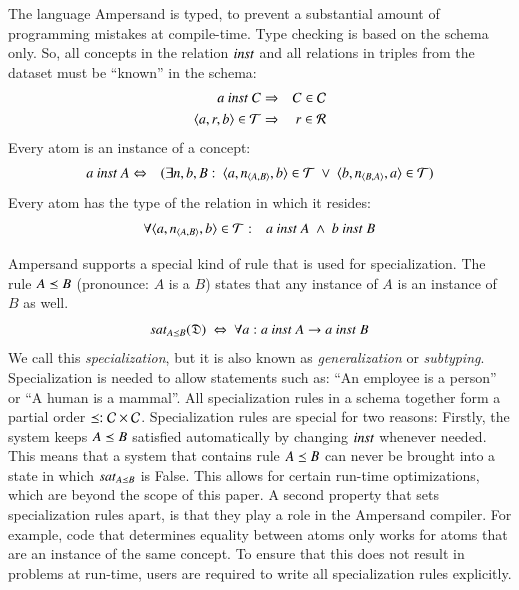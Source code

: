 \documentclass{elsarticle}
\begin{document}
   The language Ampersand is typed, to prevent a substantial amount of programming mistakes at compile-time.
   Type checking is based on the schema only.
   So, all concepts in the relation $\text{\it inst\/}$ and all relations in triples from the dataset must be ``known'' in the schema:
\begin{eqnarray}
   a\ \text{\it inst\/}\ C&\Rightarrow&C\in\mathcal{C}
   \label{eqn:concepts}\\
   \langle{a},{r},{b}\rangle\in\mathcal{T}&\Rightarrow&r\in\mathcal{R}
   \label{eqn:define R}
\end{eqnarray}
   Every atom is an instance of a concept:
\begin{eqnarray}
   a\ \inst\ A&\Leftrightarrow&(\exists n,b,B:\ \triple{a}{\declare{n}{A}{B}}{b}\in\triples\ \vee\ \triple{b}{\declare{n}{B}{A}}{a}\in\triples)
   \label{eqn:instance}
\end{eqnarray}
   Every atom has the type of the relation in which it resides:
\begin{eqnarray}
   \forall\triple{a}{\declare{n}{A}{B}}{b}\in\triples&:&a\ \inst\ A\ \wedge\ b\ \inst\ B
   \label{eqn:type}
\end{eqnarray}

   Ampersand supports a special kind of rule that is used for specialization.
   The rule $A\preceq B$ (pronounce: $A$ is a $B$) states that any instance of $A$ is an instance of $B$ as well.
\begin{equation}
   \label{eqn:specialization}
   \sat{A\isa B}{\dataset}\ \Leftrightarrow\ \forall a: a\ \inst\ A\rightarrow a\ \inst\ B
\end{equation}
   We call this {\em specialization}, but it is also known as {\em generalization} or {\em subtyping}.
   Specialization is needed to allow statements such as: ``An employee is a person'' or ``A human is a mammal''.
   All specialization rules in a schema together form a partial order $\preceq : \mathcal{C}\times\mathcal{C}$.
   Specialization rules are special for two reasons:
   Firstly, the system keeps $A\preceq B$ satisfied automatically by changing $\text{\it inst\/}$ whenever needed.
   This means that a system that contains rule $A\preceq B$ can never be brought into a state in which $\text{\it sat\/}_{A\preceq B}$ is False.
   This allows for certain run-time optimizations, which are beyond the scope of this paper.
   A second property that sets specialization rules apart, is that they play a role in the Ampersand compiler.
   For example, code that determines equality between atoms only works for atoms that are an instance of the same concept.
   To ensure that this does not result in problems at run-time, users are required to write all specialization rules explicitly.
\end{document}
